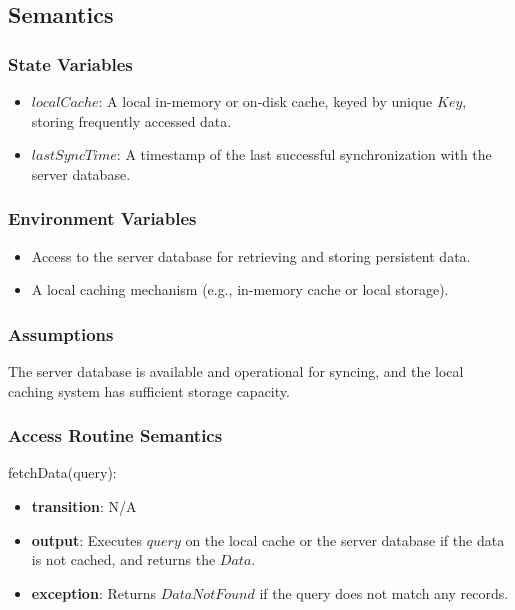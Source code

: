 \documentclass[12pt, titlepage]{article}
\begin{document}
\subsection{Semantics}

\subsubsection{State Variables}

\begin{itemize}
  \item \( localCache \): A local in-memory or on-disk cache, keyed by unique \( Key \), storing frequently accessed data.
  \item \( lastSyncTime \): A timestamp of the last successful synchronization with the server database.
\end{itemize}

\subsubsection{Environment Variables}

\begin{itemize}
  \item Access to the server database for retrieving and storing persistent data.
  \item A local caching mechanism (e.g., in-memory cache or local storage).
\end{itemize}

\subsubsection{Assumptions}

The server database is available and operational for syncing, and the local caching system has sufficient storage capacity.

\subsubsection{Access Routine Semantics}

\noindent fetchData(query):
\begin{itemize}
  \item \textbf{transition}: N/A
  \item \textbf{output}: Executes \( query \) on the local cache or the server database if the data is not cached, and returns the \( Data \).
  \item \textbf{exception}: Returns \( DataNotFound \) if the query does not match any records.
\end{itemize}
\end{document}
